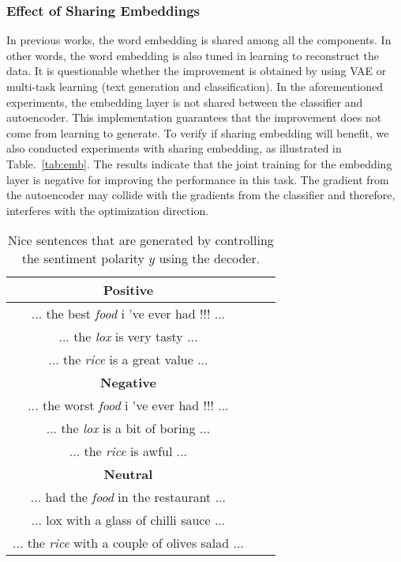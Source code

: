 \documentclass[11pt,a4paper]{article}
\begin{document}
\subsubsection{Effect of Sharing Embeddings}
In previous works, the word embedding is shared among
all the components. In other words, the word embedding is also tuned in learning to reconstruct the data. It is questionable whether the improvement is obtained by using VAE or multi-task learning (text generation and classification). In the aforementioned experiments, the embedding layer is not shared between the classifier and autoencoder. This implementation guarantees that the improvement does not come from learning to generate.
To verify if sharing embedding will benefit, we also conducted experiments with sharing embedding, as illustrated in Table.~\ref{tab:emb}.
The results indicate that the joint training for the embedding layer is negative for improving the performance in this task. The gradient from the autoencoder may collide with the gradients from the classifier and therefore,
interferes with the optimization direction.


\begin{table}
	\centering
	\begin{tabular}{ccc}
		\toprule
		\textbf{Positive}\\
		\hline
... the best \emph{food} i 've ever had !!! ...  \\
		... the \emph{lox} is very tasty ... \\
		... the \emph{rice} is a great value ... \\
		\toprule
		\textbf{Negative}\\
		\hline
... the worst \emph{food} i 've ever had !!! ... \\
		... the \emph{lox} is a bit of boring ... \\
		... the \emph{rice} is awful ... \\
		\toprule
		\textbf{Neutral}\\
		\hline
... had the \emph{food} in the restaurant ... \\
		... lox with a glass of chilli sauce ... \\
		... the \emph{rice} with a couple of olives salad ... \\
		\hline
	\end{tabular}
	\caption{Nice sentences that are generated by controlling the sentiment polarity $y$ using the decoder. }\label{tab:gen}
\end{table}
\end{document}

